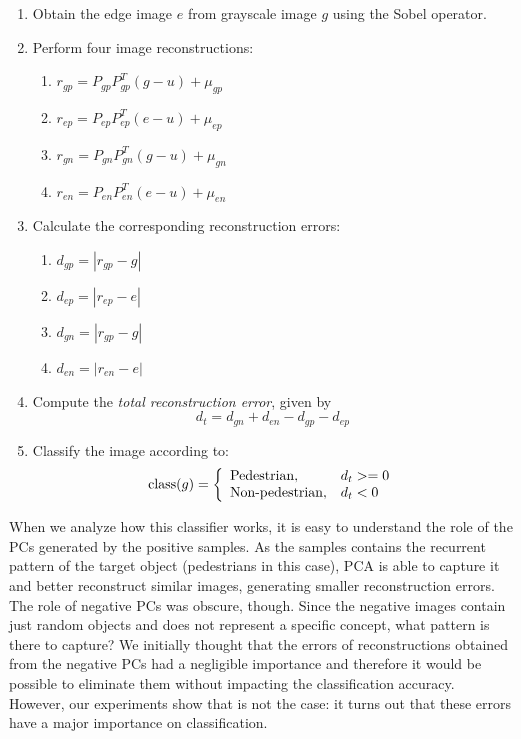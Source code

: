 \documentclass[10pt, conference, compsocconf]{IEEEtran}
\begin{document}
\begin{enumerate}
  \item Obtain the edge image $e$ from grayscale image $g$ using the Sobel operator.
  \item Perform four image reconstructions:
    \begin{enumerate}
      \item $r_{gp} = P_{gp} P_{gp}^T(g-u) + \mu_{gp}$
      \item $r_{ep} = P_{ep} P_{ep}^T(e-u) + \mu_{ep}$
      \item $r_{gn} = P_{gn} P_{gn}^T(g-u) + \mu_{gn}$
      \item $r_{en} = P_{en} P_{en}^T(e-u) + \mu_{en}$
    \end{enumerate}
  \item Calculate the corresponding reconstruction errors:
    \begin{enumerate}
      \item $d_{gp} = |r_{gp} - g|$
      \item $d_{ep} = |r_{ep} - e|$
      \item $d_{gn} = |r_{gp} - g|$
      \item $d_{en} = |r_{en} - e|$
    \end{enumerate}
  \item Compute the \emph{total reconstruction error}, given by
    \begin{equation}
      d_t = d_{gn} + d_{en} - d_{gp} - d_{ep}
      \label{total_error}
    \end{equation}
  \item Classify the image according to:
    \begin{equation}
      \textrm{class}(g) = \left\{
        \begin{array}{l l}
         \textrm{Pedestrian}, & d_t >= 0\\
         \textrm{Non-pedestrian}, & d_t < 0
        \end{array}
      \right.
    \end{equation}
  
\end{enumerate}

When we analyze how this classifier works, it is easy to understand the role of the PCs generated by the positive samples. As the samples contains the recurrent pattern of the target object (pedestrians in this case), PCA is able to capture it and better reconstruct similar images, generating smaller reconstruction errors. The role of negative PCs was obscure, though. Since the negative images contain just random objects and does not represent a specific concept, what pattern is there to capture? We initially thought that the errors of reconstructions obtained from the negative PCs had a negligible importance and therefore it would be possible to eliminate them without impacting the classification accuracy. However, our experiments show that is not the case: it turns out that these errors have a major importance on classification.
\end{document}
